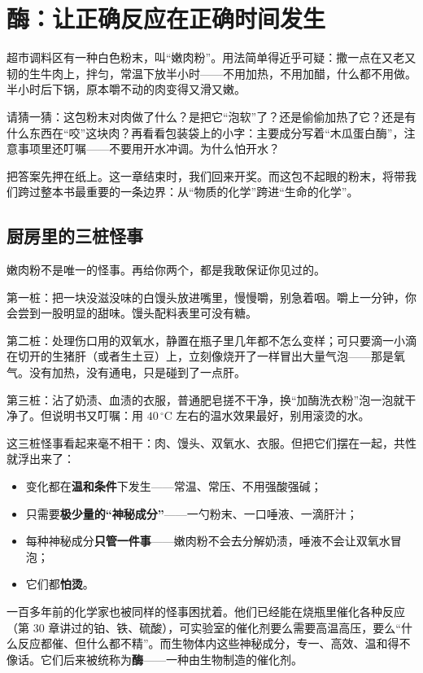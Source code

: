 \chapter{酶：让正确反应在正确时间发生}

\begin{kaichang}
超市调料区有一种白色粉末，叫“嫩肉粉”。用法简单得近乎可疑：撒一点在又老又韧的生牛肉上，拌匀，常温下放半小时——不用加热，不用加醋，什么都不用做。半小时后下锅，原本嚼不动的肉变得又滑又嫩。

请猜一猜：这包粉末对肉做了什么？是把它“泡软”了？还是偷偷加热了它？还是有什么东西在“咬”这块肉？再看看包装袋上的小字：主要成分写着“木瓜蛋白酶”，注意事项里还叮嘱——不要用开水冲调。为什么怕开水？

把答案先押在纸上。这一章结束时，我们回来开奖。而这包不起眼的粉末，将带我们跨过整本书最重要的一条边界：从“物质的化学”跨进“生命的化学”。
\end{kaichang}

\section{厨房里的三桩怪事}

嫩肉粉不是唯一的怪事。再给你两个，都是我敢保证你见过的。

第一桩：把一块没滋没味的白馒头放进嘴里，慢慢嚼，别急着咽。嚼上一分钟，你会尝到一股明显的甜味。馒头配料表里可没有糖。

第二桩：处理伤口用的双氧水，静置在瓶子里几年都不怎么变样；可只要滴一小滴在切开的生猪肝（或者生土豆）上，立刻像烧开了一样冒出大量气泡——那是氧气。没有加热，没有通电，只是碰到了一点肝。

第三桩：沾了奶渍、血渍的衣服，普通肥皂搓不干净，换“加酶洗衣粉”泡一泡就干净了。但说明书又叮嘱：用 $40\,^{\circ}\mathrm{C}$ 左右的温水效果最好，别用滚烫的水。

这三桩怪事看起来毫不相干：肉、馒头、双氧水、衣服。但把它们摆在一起，共性就浮出来了：

\begin{itemize}[itemsep=2pt]
\item 变化都在\textbf{温和条件}下发生——常温、常压、不用强酸强碱；
\item 只需要\textbf{极少量的“神秘成分”}——一勺粉末、一口唾液、一滴肝汁；
\item 每种神秘成分\textbf{只管一件事}——嫩肉粉不会去分解奶渍，唾液不会让双氧水冒泡；
\item 它们都\textbf{怕烫}。
\end{itemize}

一百多年前的化学家也被同样的怪事困扰着。他们已经能在烧瓶里催化各种反应（第 30 章讲过的铂、铁、硫酸），可实验室的催化剂要么需要高温高压，要么“什么反应都催、但什么都不精”。而生物体内这些神秘成分，专一、高效、温和得不像话。它们后来被统称为\textbf{酶}——一种由生物制造的催化剂。


